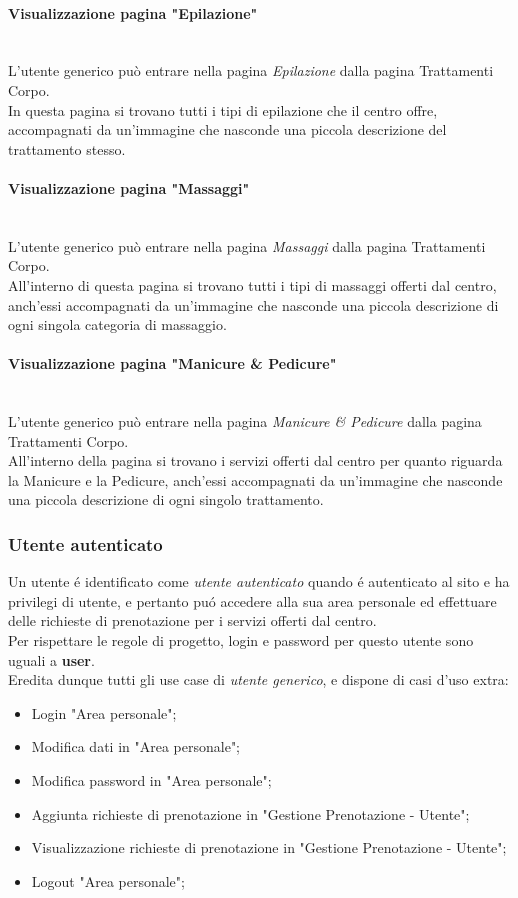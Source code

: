 \documentclass[]{article}
\begin{document}
\paragraph{Visualizzazione pagina "Epilazione"}\mbox{}\\
L'utente generico può entrare nella pagina \textit{Epilazione} dalla pagina Trattamenti Corpo.\\
In questa pagina si trovano tutti i tipi di epilazione che il centro offre, accompagnati da un'immagine che nasconde una piccola descrizione del trattamento stesso.

\paragraph{Visualizzazione pagina "Massaggi"}\mbox{}\\
L'utente generico può entrare nella pagina \textit{Massaggi} dalla pagina Trattamenti Corpo.\\
All'interno di questa pagina si trovano tutti i tipi di massaggi offerti dal centro, anch'essi accompagnati da un'immagine che nasconde una piccola descrizione di ogni singola categoria di massaggio.

\paragraph{Visualizzazione pagina "Manicure \& Pedicure"}\mbox{}\\
L'utente generico può entrare nella pagina \textit{Manicure \& Pedicure} dalla pagina Trattamenti Corpo.\\
All'interno della pagina si trovano i servizi offerti dal centro per quanto riguarda la Manicure e la Pedicure, anch'essi accompagnati da un'immagine che nasconde una piccola descrizione di ogni singolo trattamento.

\subsubsection{Utente autenticato}
Un utente é identificato come \textit{utente autenticato} quando é autenticato al sito e ha privilegi di utente, e pertanto puó accedere alla sua area personale ed effettuare delle richieste di prenotazione per i servizi offerti dal centro.\\
Per rispettare le regole di progetto, login e password per questo utente sono uguali a \textbf{user}.\\
Eredita dunque tutti gli use case di \textit{utente generico}, e dispone di casi d'uso extra:
\begin{itemize}
	\item Login "Area personale";
	\item Modifica dati in "Area personale";
	\item Modifica password in "Area personale";
	\item Aggiunta richieste di prenotazione in "Gestione Prenotazione - Utente";
	\item Visualizzazione richieste di prenotazione in "Gestione Prenotazione - Utente";
	\item Logout "Area personale";
\end{itemize}
\end{document}
